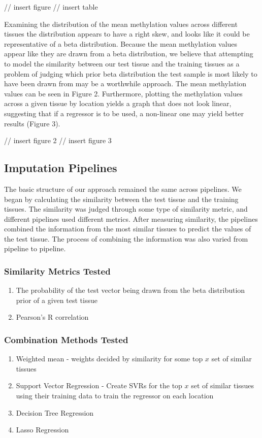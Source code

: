 \documentclass{article} %
\begin{document}
// insert figure
// insert table

Examining the distribution of the mean methylation values across different tissues the distribution appears to have a right skew, and looks like it could be representative of a beta distribution. Because the mean methylation values appear like they are drawn from a beta distribution, we believe that attempting to model the similarity between our test tissue and the training tissues as a problem of judging which prior beta distribution the test sample is most likely to have been drawn from may be a worthwhile approach. The mean methylation values can be seen in Figure 2. Furthermore, plotting the methylation values across a given tissue by location yields a graph that does not look linear, suggesting that if a regressor is to be used, a non-linear one may yield better results (Figure 3).

// insert figure 2
// insert figure 3

\subsection{Imputation Pipelines}
The basic structure of our approach remained the same across pipelines. We began by calculating the similarity between the test tissue and the training tissues. The similarity was judged through some type of similarity metric, and different pipelines used different metrics. After measuring similarity, the pipelines combined the information from the most similar tissues to predict the values of the test tissue. The process of combining the information was also varied from pipeline to pipeline.
\subsubsection{Similarity Metrics Tested}
\begin{enumerate}
	\item The probability of the test vector being drawn from the beta distribution prior of a given test tissue
	\item Pearson's R correlation
\end{enumerate}

\subsubsection{Combination Methods Tested}
\begin{enumerate}
	\item Weighted mean - weights decided by similarity for some top $x$ set of similar tissues
	\item Support Vector Regression - Create SVRs for the top $x$ set of similar tissues using their training data to train the regressor on each location
	\item Decision Tree Regression
	\item Lasso Regression
\end{enumerate}
\end{document}
